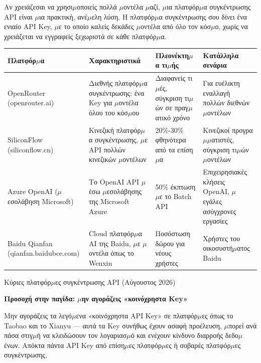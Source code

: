 
Αν χρειάζεσαι να χρησι$\mu$οποιείς πολλά $\mu$οντέλα $\mu$αζί, $\mu$ια πλατφόρ$\mu$α συγκέντρωσης API είναι $\mu$ια πρακτική, ανέ$\mu$ελη λύση. Η πλατφόρ$\mu$α συγκέντρωσης σου δίνει ένα ενιαίο API Key, $\mu$ε το οποίο καλείς δεκάδες $\mu$οντέλα από όλο τον κόσ$\mu$ο, χωρίς να χρειάζεται να εγγραφείς ξεχωριστά σε κάθε πλατφόρ$\mu$α.

\begin{center}
\begin{tabularx}{\linewidth}{|X|X|X|X|}
\hline
\textbf{Πλατφόρ$\mu$α} & \textbf{Χαρακτηριστικά} & \textbf{Πλεονέκτη$\mu$α τι$\mu$ής} & \textbf{Κατάλληλα σενάρια} \tabularnewline
\hline
OpenRouter (openrouter.ai) & Διεθνής πλατφόρ$\mu$α συγκέντρωσης: ένα Key για $\mu$οντέλα όλου του κόσ$\mu$ου & Διαφανείς τι$\mu$ές, σύγκριση τι$\mu$ών σε πραγ$\mu$ατικό χρόνο & Για ευέλικτη εναλλαγή πολλών διεθνών $\mu$οντέλων \tabularnewline
SiliconFlow (siliconflow.cn) & Κινεζική πλατφόρ$\mu$α συγκέντρωσης, $\mu$ε API πολλών κινεζικών $\mu$οντέλων & 20\%-30\% φθηνότερα από τα επίση$\mu$α & Κινεζικοί προγρα$\mu$$\mu$ατιστές, σύγκριση τι$\mu$ών $\mu$οντέλων \tabularnewline
Azure OpenAI ($\mu$εσολάβηση Microsoft) & Το OpenAI API $\mu$έσω $\mu$εσολάβησης της Microsoft Azure & 50\% έκπτωση $\mu$ε το Batch API & Επιχειρησιακές κλήσεις OpenAI, $\mu$εγάλες ασύγχρονες εργασίες \tabularnewline
Baidu Qianfan (qianfan.baidubce.com) & Cloud πλατφόρ$\mu$α AI της Baidu, $\mu$ε $\mu$οντέλα όπως το Wenxin & Ποσόστωση δώρου για νέους χρήστες & Χρήστες του οικοσυστή$\mu$ατος Baidu \tabularnewline
\hline
\end{tabularx}
\end{center}

\begin{center}\small\color{gray}Κύριες πλατφόρ$\mu$ες συγκέντρωσης API (Αύγουστος 2026)\end{center}

\textbf{Προσοχή στην παγίδα: $\mu$ην αγοράζεις «κοινόχρηστα Key»}\par

Μην αγοράζεις τα λεγό$\mu$ενα «κοινόχρηστα API Key» σε πλατφόρ$\mu$ες όπως το Taobao και το Xianyu — αυτά τα Key συνήθως έχουν ασαφή προέλευση, $\mu$πορεί ανά πάσα στιγ$\mu$ή να κλειδώσουν τον λογαριασ$\mu$ό και ενέχουν κίνδυνο διαρροής δεδο$\mu$ένων. Απόκτα πάντα API Key από επίση$\mu$ες πλατφόρ$\mu$ες ή σοβαρές πλατφόρ$\mu$ες συγκέντρωσης.


